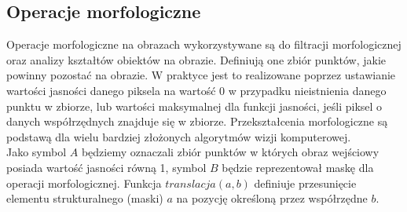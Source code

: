 \subsection{Operacje morfologiczne}
Operacje morfologiczne na obrazach wykorzystywane są do filtracji morfologicznej oraz analizy kształtów obiektów na obrazie. Definiują one zbiór punktów, jakie powinny pozostać na obrazie. W praktyce jest to realizowane poprzez ustawianie wartości jasności danego piksela na wartość 0 w przypadku nieistnienia danego punktu w zbiorze, lub wartości maksymalnej dla funkcji jasności, jeśli piksel o danych współrzędnych znajduje się w zbiorze. Przekształcenia morfologiczne są podstawą dla wielu bardziej złożonych algorytmów wizji komputerowej.\\
Jako symbol $A$ będziemy oznaczali zbiór punktów w których obraz wejściowy posiada wartość jasności równą 1, symbol $B$ będzie reprezentował maskę dla operacji morfologicznej. Funkcja $translacja(a, b)$ definiuje przesunięcie elementu strukturalnego (maski) $a$ na pozycję określoną przez współrzędne $b$.
